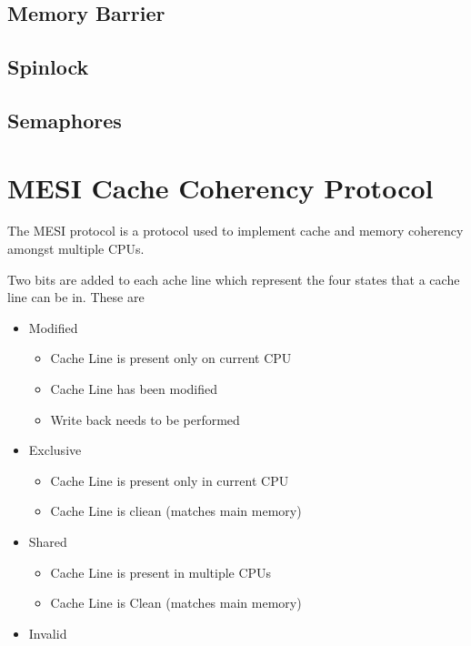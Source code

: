 \documentclass{article}
\begin{document}
\subsection{Memory Barrier}




\subsection{Spinlock}

\subsection{Semaphores}


\section{MESI Cache Coherency Protocol}

The MESI protocol is a protocol used to implement cache and memory coherency amongst multiple CPUs. \cite{Birdetal2001}

Two bits are added to each ache line which represent the four states that a cache line can be in. These are

\begin{itemize}
\item Modified
  \begin{itemize}
    \item Cache Line is present only on current CPU
    \item Cache Line has been modified
    \item Write back needs to be performed
  \end{itemize}


\item Exclusive
    \begin{itemize}
    \item Cache Line is present only in current CPU
    \item Cache Line is cliean (matches main memory)
    \end{itemize}
    
  \item Shared
    \begin{itemize}
    \item Cache Line is present in multiple CPUs
    \item Cache Line is Clean (matches main memory)
    \end{itemize}
  \item Invalid 
\end{itemize}
\end{document}
